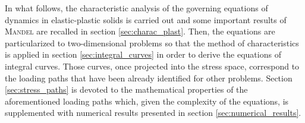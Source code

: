 In what follows, the characteristic analysis of the governing equations of dynamics in elastic-plastic solids is carried out and some important results of \textsc{Mandel} \cite{Mandel62} are recalled in section \ref{sec:charac_plast}.
Then, the equations are particularized to two-dimensional problems so that the method of characteristics is applied in section \ref{sec:integral_curves} in order to derive the equations of integral curves.
Those curves, once projected into the stress space, correspond to the loading paths that have been already identified for other problems.
Section \ref{sec:stress_paths} is devoted to the mathematical properties of the aforementioned loading paths which, given the complexity of the equations, is supplemented with numerical results presented in section \ref{sec:numerical_results}.



